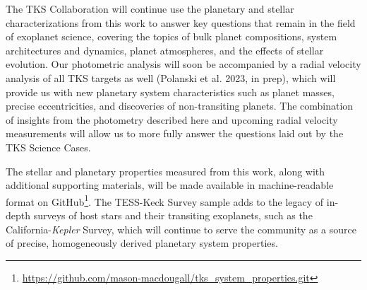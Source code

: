 \documentclass[twocolumn]{aastex63}
\begin{document}
The TKS Collaboration will continue use the planetary and stellar characterizations from this work to answer key questions that remain in the field of exoplanet science, covering the topics of bulk planet compositions, system architectures and dynamics, planet atmospheres, and the effects of stellar evolution. Our photometric analysis will soon be accompanied by a radial velocity analysis of all TKS targets as well (Polanski et al. 2023, in prep), which will provide us with new planetary system characteristics such as planet masses, precise eccentricities, and discoveries of non-transiting planets. The combination of insights from the photometry described here and upcoming radial velocity measurements will allow us to more fully answer the questions laid out by the TKS Science Cases.

The stellar and planetary properties measured from this work, along with additional supporting materials, will be made available in machine-readable format on GitHub\footnote{\url{https://github.com/mason-macdougall/tks_system_properties.git}}. The TESS-Keck Survey sample adds to the legacy of in-depth surveys of host stars and their transiting exoplanets, such as the California-\textit{Kepler} Survey, which will continue to serve the community as a source of precise, homogeneously derived planetary system properties.
\end{document}
